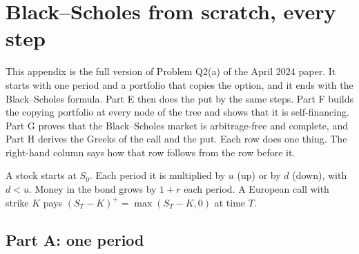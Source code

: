 \chapter{Black--Scholes from scratch, every step}\label{app:bs}

This appendix is the full version of Problem Q2(a) of the April 2024 paper. It starts with one period and a portfolio that copies the option, and it ends with the Black--Scholes formula. Part E then does the put by the same steps. Part F builds the copying portfolio at every node of the tree and shows that it is self-financing. Part G proves that the Black--Scholes market is arbitrage-free and complete, and Part H derives the Greeks of the call and the put. Each row does one thing. The right-hand column says how that row follows from the row before it.

\begin{setup}
A stock starts at $S_0$. Each period it is multiplied by $u$ (up) or by $d$ (down), with $d<u$. Money in the bond grows by $1+r$ each period. A European call with strike $K$ pays $(S_T-K)^+=\max(S_T-K,0)$ at time $T$.
\end{setup}

\section*{Part A: one period}

